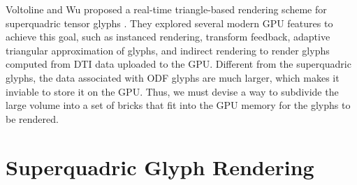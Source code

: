 \documentclass[twoside,twocolumn,10pt]{article}
\begin{document}



Voltoline and Wu \cite{voltoline2021} proposed a real-time triangle-based rendering scheme for superquadric tensor glyphs \cite{Kindlmann2004}. They explored several modern GPU features to achieve this goal, such as instanced rendering, transform feedback, adaptive triangular approximation of glyphs, and indirect rendering to render glyphs computed from DTI data uploaded to the GPU. Different from the superquadric glyphs, the data associated with ODF glyphs are much larger, which makes it inviable to store it on the GPU. Thus, we must devise a way to subdivide the large volume into a set of bricks that fit into the GPU memory for the glyphs to be rendered.






\section{Superquadric Glyph Rendering}
\label{sec:superquadric_rendering}

\end{document}
